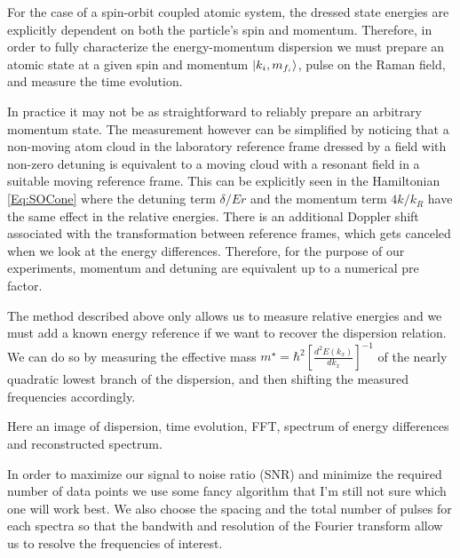 

For the case of a spin-orbit coupled atomic system, the dressed state energies are explicitly dependent on both the particle's spin and momentum. Therefore, in order to fully characterize the energy-momentum dispersion we must prepare an atomic state at a given spin and momentum $|k_i,m_{f_i}\rangle$, pulse on the Raman field, and measure the time evolution.  

In practice it may not be as straightforward to reliably prepare an arbitrary momentum state. The measurement however can be simplified by noticing that a non-moving atom cloud in the laboratory reference frame dressed by a field with non-zero detuning is equivalent to a moving cloud with a resonant field in a suitable moving reference frame. This can be explicitly seen in the Hamiltonian \ref{Eq:SOCone} where the detuning term $\delta/Er$  and the momentum term $4 k/k_R$ have the same effect in the relative energies. There is an additional Doppler shift associated with the transformation between reference frames, which gets canceled when we look at the energy differences. Therefore, for the purpose of our experiments, momentum and detuning are equivalent up to a numerical pre factor. 

The method described above only allows us to measure relative energies and we must add a known energy reference if we want to recover the dispersion relation. We can do so by measuring the effective mass $m^{\star} = \hbar^2[\frac{d^2E(k_x)}{dk_x}]^{-1}$ of the nearly quadratic lowest branch of the dispersion, and then shifting the measured frequencies accordingly. 

Here an image of dispersion, time evolution, FFT, spectrum of energy differences and reconstructed spectrum.

In order to maximize our signal to noise ratio (SNR) and minimize the required number of data points we use some fancy algorithm that I'm still not sure which one will work best. We also choose the spacing and the total number of pulses for each spectra so that the bandwith and resolution of the Fourier transform allow us to resolve the frequencies of interest. 



